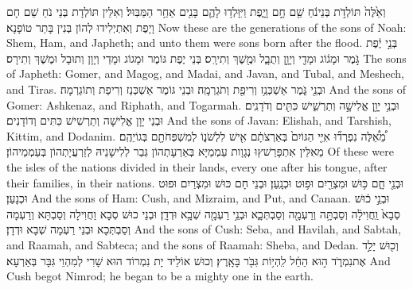 \newperek
{}%
{וְאֵ֙לֶּה֙ תּוֹלְדֹ֣ת בְּנֵי\maqqaf נֹ֔חַ שֵׁ֖ם חָ֣ם וָיָ֑פֶת וַיִּוָּלְד֥וּ לָהֶ֛ם בָּנִ֖ים אַחַ֥ר הַמַּבּֽוּל׃}
{וְאִלֵּין תּוֹלְדָת בְּנֵי נֹחַ שֵׁם חָם וָיָפֶת וְאִתְיְלִידוּ לְהוֹן בְּנִין בָּתַר טוֹפָנָא׃}
{Now these are the generations of the sons of Noah: Shem, Ham, and Japheth; and unto them were sons born after the flood.}{}
{בְּנֵ֣י יֶ֔פֶת גֹּ֣מֶר וּמָג֔וֹג וּמָדַ֖י וְיָוָ֣ן וְתֻבָ֑ל וּמֶ֖שֶׁךְ וְתִירָֽס׃}
{בְּנֵי יֶפֶת גּוֹמֶר וּמָגוֹג וּמָדַי וְיָוָן וְתוּבָל וּמֶשֶׁךְ וְתִירָס׃}
{The sons of Japheth: Gomer, and Magog, and Madai, and Javan, and Tubal, and Meshech, and Tiras.}{}
{וּבְנֵ֖י גֹּ֑מֶר אַשְׁכְּנַ֥ז וְרִיפַ֖ת וְתֹגַרְמָֽה׃}
{וּבְנֵי גּוֹמֶר אַשְׁכְּנַז וְרִיפַת וְתוֹגַרְמָה׃}
{And the sons of Gomer: Ashkenaz, and Riphath, and Togarmah.}{}
{וּבְנֵ֥י יָוָ֖ן אֱלִישָׁ֣ה וְתַרְשִׁ֑ישׁ כִּתִּ֖ים וְדֹדָנִֽים׃}
{וּבְנֵי יָוָן אֱלִישָׁה וְתַרְשִׁישׁ כִּתִּים וְדוֹדָנִים׃}
{And the sons of Javan: Elishah, and Tarshish, Kittim, and Dodanim.}{}
{מֵ֠אֵ֠לֶּה נִפְרְד֞וּ אִיֵּ֤י הַגּוֹיִם֙ בְּאַרְצֹתָ֔ם אִ֖ישׁ לִלְשֹׁנ֑וֹ לְמִשְׁפְּחֹתָ֖ם בְּגוֹיֵהֶֽם׃}
{מֵאִלֵּין אִתְפָּרַשׁץוּ נְגָוָות עַמְמַיָּא בְּאַרְעָתְהוֹן גְּבַר לְלִישָׁנֵיהּ לְזַרְעֲיָתְהוֹן בְּעַמְמֵיהוֹן׃}
{Of these were the isles of the nations divided in their lands, every one after his tongue, after their families, in their nations.}{}
{וּבְנֵ֖י חָ֑ם כּ֥וּשׁ וּמִצְרַ֖יִם וּפ֥וּט וּכְנָֽעַן׃}
{וּבְנֵי חָם כּוּשׁ וּמִצְרַיִם וּפוּט וּכְנָעַן׃}
{And the sons of Ham: Cush, and Mizraim, and Put, and Canaan.}{}
{וּבְנֵ֣י כ֔וּשׁ סְבָא֙ וַֽחֲוִילָ֔ה וְסַבְתָּ֥ה וְרַעְמָ֖ה וְסַבְתְּכָ֑א וּבְנֵ֥י רַעְמָ֖ה שְׁבָ֥א וּדְדָֽן׃}
{וּבְנֵי כוּשׁ סְבָא וַחֲוִילָה וְסַבְתָּא וְרַעְמָה וְסַבְתְּכָא וּבְנֵי רַעְמָה שְׁבָא וּדְדָן׃}
{And the sons of Cush: Seba, and Havilah, and Sabtah, and Raamah, and Sabteca; and the sons of Raamah: Sheba, and Dedan.}{}
{וְכ֖וּשׁ יָלַ֣ד אֶת\maqqaf נִמְרֹ֑ד ה֣וּא הֵחֵ֔ל לִֽהְי֥וֹת גִּבֹּ֖ר בָּאָֽרֶץ׃}
{וְכוּשׁ אוֹלֵיד יָת נִמְרוֹד הוּא שָׁרִי לְמִהְוֵי גִּבָּר בְּאַרְעָא׃}
{And Cush begot Nimrod; he began to be a mighty one in the earth.}{}

